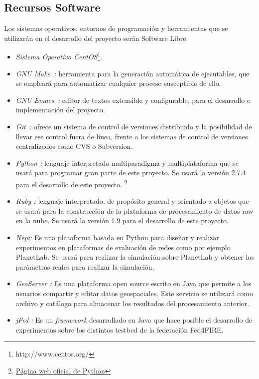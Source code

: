 \subsection{Recursos Software}
\label{sec:software}
Los sistemas operativos, entornos de programación y herramientas que se
utilizarán en el desarrollo del proyecto serán Software Libre.

\begin{itemize}

\item \emph {Sistema Operativo CentOS}\footnote{http://www.centos.org/}.

\item \emph{GNU Make~\cite{make}:}
  herramienta para la generación automática de
  ejecutables, que se empleará para automatizar cualquier proceso susceptible de
  ello.

\item \emph{GNU Emacs~\cite{emacs}:}
  editor de textos extensible y configurable, para el desarrollo e implementación del proyecto.


\item\emph{ Git~\cite{git}:} ofrece un
  sistema de control de versiones distribuido y la posibilidad de llevar ese
  control fuera de línea, frente a los sistemas de control de versiones
  centralizados como \textsc{CVS} o Subversion. %

\item \emph{Python \cite{Python}:} lenguaje interpretado multiparadigma y multiplataforma que se usará para programar gran parte de este proyecto. Se usará la versión 2.7.4 para el desarrollo de este proyecto.
\footnote{\href{http://python.org}{Página web oficial de Python}}

\item \emph{Ruby \cite{Ruby}:} lenguaje interpretado, de propósito general y orientado a objetos que se usará para la construcción de la plataforma de procesamiento de datos raw en la nube.
Se usará la versión 1.9 para el desarrollo de este proyecto.

\item \emph{Nepi\cite{Nepi}:} Es una plataforma basada en Python para diseñar y realizar experimentos en plataformas de evaluación de redes como por ejemplo PlanetLab. Se usará para realizar la simulación sobre PlanetLab y obtener los parámetros reales para realizar la simulación.

\item \emph{GeoServer \cite{GS}:} Es una plataforma open source escrito en Java que permite a los usuarios compartir y editar datos geospaciales. Este servicio se utilizará como archivo y catálogo para almacenar los resultados del procesamiento anterior.

\item \emph{jFed \cite{jFed}:} Es un \emph{framework} desarrollado en Java que hace posible el desarrollo de experimentos sobre los distintos testbed de la federación Fed4FIRE.


\end{itemize}


